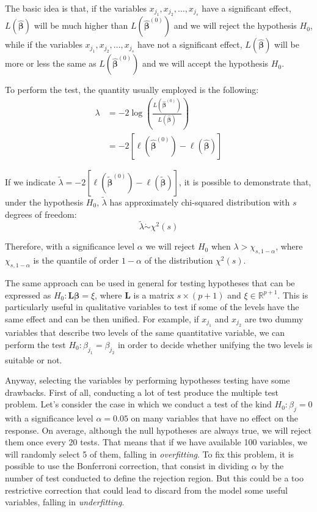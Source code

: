 \documentclass[a4paper, nobind]{templates/ociamthesis}
\theoremstyle{definition}
\theoremstyle{definition}
\theoremstyle{definition}
\theoremstyle{remark}
\begin{document}
The basic idea is that, if the variables \(x_{j_1}, x_{j_2}, \dots, x_{j_s}\) have a significant effect, \(L\left(\hat{\boldsymbol{\beta}}\right)\) will be much higher than \(L\left(\hat{\boldsymbol{\beta}}^{(0)}\right)\) and we will reject the hypothesis \(H_0\), while if the variables \(x_{j_1}, x_{j_2}, \dots, x_{j_s}\) have not a significant effect, \(L\left(\hat{\boldsymbol{\beta}}\right)\) will be more or less the same as \(L\left(\hat{\boldsymbol{\beta}}^{(0)}\right)\) and we will accept the hypothesis \(H_0\).

To perform the test, the quantity usually employed is the following:
\begin{align*}
\lambda & = -2 \log{\left( \frac{L\left(\hat{\boldsymbol{\beta}}^{(0)}\right)}{L\left(\hat{\boldsymbol{\beta}}\right)} \right)} \\
& = -2 \left[ \ell\left(\hat{\boldsymbol{\beta}}^{(0)}\right) - \ell\left(\hat{\boldsymbol{\beta}}\right) \right]
\end{align*}

If we indicate \(\tilde{\lambda} = -2 \left[ \ell\left(\tilde{\boldsymbol{\beta}}^{(0)}\right) - \ell\left(\tilde{\boldsymbol{\beta}}\right) \right]\), it is possible to demonstrate that, under the hypothesis \(H_0\), \(\tilde{\lambda}\) has approximately chi-squared distribution with \(s\) degrees of freedom:
\[
\tilde{\lambda} \dot\sim \chi^2(s)
\]

Therefore, with a significance level \(\alpha\) we will reject \(H_0\) when \(\lambda > \chi_{s, 1-\alpha}\), where \(\chi_{s, 1-\alpha}\) is the quantile of order \(1-\alpha\) of the distribution \(\chi^2(s)\).

The same approach can be used in general for testing hypotheses that can be expressed as \(H_0: \boldsymbol{L}\boldsymbol{\beta} = \xi\), where \(\boldsymbol{L}\) is a matrix \(s\times(p+1)\) and \(\xi\in\mathbb{R}^{p+1}\). This is particularly useful in qualitative variables to test if some of the levels have the same effect and can be then unified. For example, if \(x_{j_1}\) and \(x_{j_2}\) are two dummy variables that describe two levels of the same quantitative variable, we can perform the test \(H_0: \beta_{j_1} = \beta_{j_2}\) in order to decide whether unifying the two levels is suitable or not.

Anyway, selecting the variables by performing hypotheses testing have some drawbacks. First of all, conducting a lot of test produce the multiple test problem. Let's consider the case in which we conduct a test of the kind \(H_0: \beta_j = 0\) with a significance level \(\alpha=0.05\) on many variables that have no effect on the response. On average, although the null hypotheses are always true, we will reject them once every 20 tests. That means that if we have available 100 variables, we will randomly select 5 of them, falling in \emph{overfitting}. To fix this problem, it is possible to use the Bonferroni correction, that consist in dividing \(\alpha\) by the number of test conducted to define the rejection region. But this could be a too restrictive correction that could lead to discard from the model some useful variables, falling in \emph{underfitting}.
\end{document}
